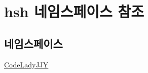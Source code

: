 \hypertarget{namespacehsh}{}\section{hsh 네임스페이스 참조}
\label{namespacehsh}
\subsection*{네임스페이스}
\begin{DoxyCompactItemize}
\item 
 \hyperlink{namespacehsh_1_1_code_lady_j_j_y}{Code\+Lady\+J\+JY}
\end{DoxyCompactItemize}
